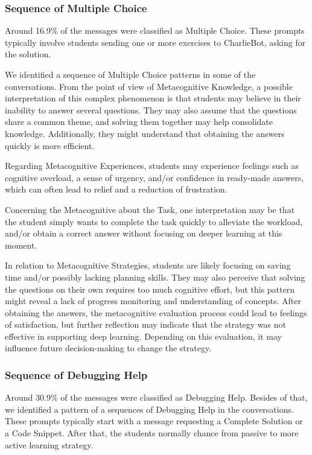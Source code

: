 \documentclass[a4paper,twoside]{article}
\begin{document}
\subsubsection*{Sequence of Multiple Choice}

Around 16.9\% of the messages were classified as Multiple Choice. These prompts
typically involve students sending one or more exercises to CharlieBot, asking
for the solution.

We identified a sequence of Multiple Choice patterns in some of the
conversations. From the point of view of Metacognitive Knowledge, a possible
interpretation of this complex phenomenon is that students may believe in their
inability to answer several questions. They may also assume that the questions
share a common theme, and solving them together may help consolidate knowledge.
Additionally, they might understand that obtaining the answers quickly is more
efficient.

Regarding Metacognitive Experiences, students may experience feelings such as
cognitive overload, a sense of urgency, and/or confidence in ready-made answers,
which can often lead to relief and a reduction of frustration.

Concerning the Metacognitive about the Task, one interpretation may be that the
student simply wants to complete the task quickly to alleviate the workload,
and/or obtain a correct answer without focusing on deeper learning at
this moment.

In relation to Metacognitive Strategies, students are likely focusing on saving
time and/or possibly lacking planning skills. They may also perceive that
solving the questions on their own requires too much cognitive effort, but this
pattern might reveal a lack of progress monitoring and understanding of
concepts. After obtaining the answers, the metacognitive evaluation process
could lead to feelings of satisfaction, but further reflection may indicate that
the strategy was not effective in supporting deep learning. Depending on this
evaluation, it may influence future decision-making to change the strategy.

\subsubsection*{Sequence of Debugging Help}

Around 30.9\% of the messages were classified as Debugging Help. Besides of
that, we identified a pattern of a sequences of Debugging Help in the
conversations. These prompts typically start with a message requesting a
Complete Solution or a Code Snippet. After that, the students normally chance
from passive to more active learning strategy.
\end{document}
